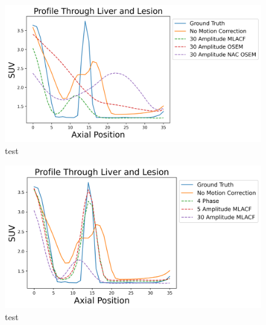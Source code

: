             \begin{figure}
                \centering
                
                \includegraphics[width=1.0\linewidth]{figures/motion_correction_2_results_2_30_amplitude_profile.png}
                
                \captionsetup{singlelinecheck=false}
                \caption{
                    test
                }
                
                \label{fig:test_30_amplitude_profile}
            \end{figure}

            \begin{figure}
                \centering
                
                \includegraphics[width=1.0\linewidth]{figures/motion_correction_2_results_2_best_profile.png}
                
                \captionsetup{singlelinecheck=false}
                \caption{
                    test
                }
                
                \label{fig:test_best_profile}
            \end{figure}
            
